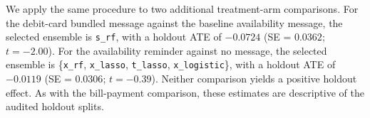 \documentclass[12pt]{article}
\newcommand{\DebitSelected}{\texttt{s\_rf}}
\newcommand{\DebitHOATE}{-0.0724}
\newcommand{\DebitHOSE}{0.0362}
\newcommand{\DebitHOT}{-2.00}
\newcommand{\FauseSelected}{\{\texttt{x\_rf}, \texttt{x\_lasso}, \texttt{t\_lasso}, \texttt{x\_logistic}\}}
\newcommand{\FauseHOATE}{-0.0119}
\newcommand{\FauseHOSE}{0.0306}
\newcommand{\FauseHOT}{-0.39}
\begin{document}
We apply the same procedure to two additional treatment-arm comparisons. For the debit-card bundled message against the baseline availability message, the selected ensemble is \DebitSelected{}, with a holdout ATE of $\DebitHOATE$ (SE = $\DebitHOSE$; $t=\DebitHOT$). For the availability reminder against no message, the selected ensemble is \FauseSelected{}, with a holdout ATE of $\FauseHOATE$ (SE = $\FauseHOSE$; $t=\FauseHOT$). Neither comparison yields a positive holdout effect. As with the bill-payment comparison, these estimates are descriptive of the audited holdout splits.

\begingroup{}

\endgroup
\end{document}
